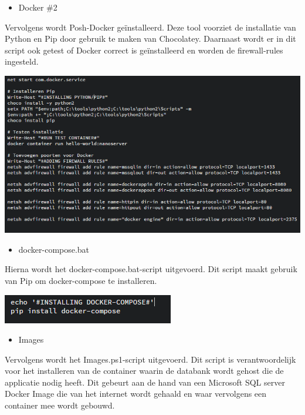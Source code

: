 \begin{itemize}[noitemsep]
	\item Docker \#2
\end{itemize}

Vervolgens wordt Posh-Docker geïnstalleerd. Deze tool voorziet de installatie van Python en Pip door gebruik te maken van Chocolatey. Daarnaast wordt er in dit script ook getest of Docker correct is geïnstalleerd en worden de firewall-rules ingesteld.

\begin{center}
	\includegraphics[scale=0.6]{img/docker02}
\end{center}

\begin{itemize}[noitemsep]
	\item docker-compose.bat
\end{itemize}

Hierna wordt het docker-compose.bat-script uitgevoerd. Dit script maakt gebruik van Pip om docker-compose te installeren.

\begin{center}
	\includegraphics[scale=0.6]{img/dockercompose01}
\end{center}

\begin{itemize}[noitemsep]
	\item Images
\end{itemize}

Vervolgens wordt het Images.ps1-script uitgevoerd. Dit script is verantwoordelijk voor het installeren van de container waarin de databank wordt gehost die de applicatie nodig heeft. Dit gebeurt aan de hand van een Microsoft SQL server Docker Image die van het internet wordt gehaald en waar vervolgens een container mee wordt gebouwd.

